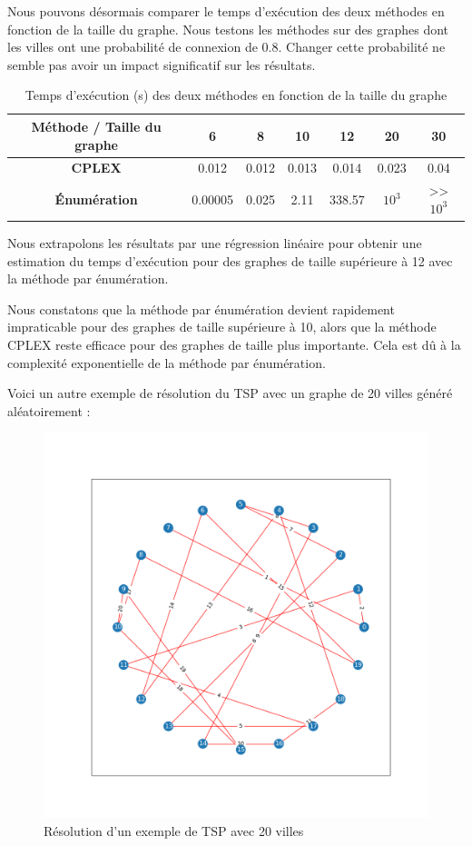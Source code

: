 Nous pouvons désormais comparer le temps d'exécution des deux méthodes en fonction de la taille du graphe. Nous testons les méthodes sur des graphes dont les villes ont une probabilité de connexion de 0.8. Changer cette probabilité ne semble pas avoir un impact significatif sur les résultats.

\begin{table}[H]
    \centering
    \begin{tabular}{|c|c|c|c|c|c|c|}
        \hline
        \textbf{Méthode / Taille du graphe} & 6 & 8 & 10 & 12 & 20 & 30 \\
        \hline
        \textbf{CPLEX} & 0.012 & 0.012 & 0.013 & 0.014 & 0.023 & 0.04 \\
        \hline
        \textbf{Énumération} & 0.00005 & 0.025 & 2.11 & 338.57 & $10^3$ & >> $10^3$ \\
        \hline
    \end{tabular}
    \caption{Temps d'exécution (s) des deux méthodes en fonction de la taille du graphe}
\end{table}

Nous extrapolons les résultats par une régression linéaire pour obtenir une estimation du temps d'exécution pour des graphes de taille supérieure à 12 avec la méthode par énumération.

Nous constatons que la méthode par énumération devient rapidement impraticable pour des graphes de taille supérieure à 10, alors que la méthode CPLEX reste efficace pour des graphes de taille plus importante. Cela est dû à la complexité exponentielle de la méthode par énumération.

\newpage

Voici un autre exemple de résolution du TSP avec un graphe de 20 villes généré aléatoirement : 

\begin{figure}[H]
    \centering
    \includegraphics[width=1\textwidth]{resources/20_20_tsp.png}
    \caption{Résolution d'un exemple de TSP avec 20 villes}
    \label{fig:2020_tsp}
\end{figure}